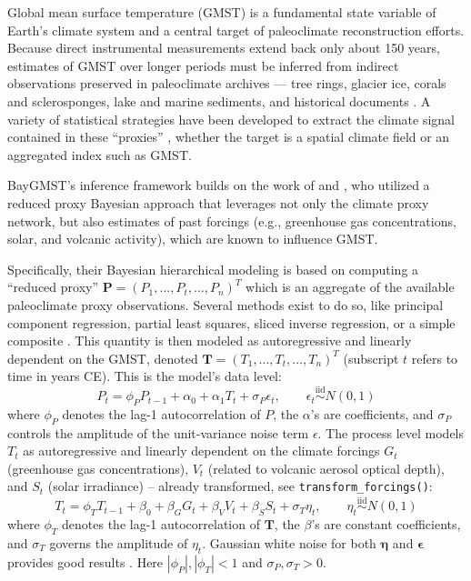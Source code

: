 \documentclass[10pt]{article}
\begin{document}
Global mean surface temperature (GMST) is a fundamental state variable of
Earth's climate system and a central target of paleoclimate reconstruction
efforts. Because direct instrumental measurements extend back only about
150 years, estimates of GMST over longer periods must be inferred from
indirect observations preserved in paleoclimate archives --- tree rings,
glacier ice, corals and sclerosponges, lake and marine sediments, and
historical documents \citep{mann1999, moberg2005}. A variety of statistical
strategies have been developed to extract the climate signal contained in
these ``proxies'' \citep{TINGLEY20121, Smerdon2016}, whether the target is
a spatial climate field \citep{Smerdon2023} or an aggregated index such as
GMST.

BayGMST's inference framework builds on the work of \citet{Barboza2014,
Barboza2019} and \citet{wang2020}, who utilized a reduced proxy Bayesian
approach that leverages not only the climate proxy network, but also
estimates of past forcings (e.g., greenhouse gas concentrations, solar, and
volcanic activity), which are known to influence GMST.

Specifically, their Bayesian hierarchical modeling is based on computing a
``reduced proxy'' $\boldsymbol{P} = (P_1,...,P_t,...,P_n)^T$ which is an
aggregate of the available paleoclimate proxy observations. Several methods
exist to do so, like principal component regression, partial least squares,
sliced inverse regression, or a simple composite \citep{Barboza2019}. This
quantity is then modeled as autoregressive and linearly dependent on the
GMST, denoted $\boldsymbol{T} = (T_1,...,T_t,...,T_n)^T$ (subscript $t$
refers to time in years CE). This is the model's data level:
\begin{equation}
  P_t = \phi_P P_{t-1} + \alpha_0 + \alpha_1 T_t + \sigma_P \epsilon_t,
  \qquad \epsilon_t \overset{\text{iid}}{\sim} N(0, 1)
  \label{eq:proxy}
\end{equation}
where $\phi_P$ denotes the lag-1 autocorrelation of $P$, the $\alpha$'s are
coefficients, and $\sigma_P$ controls the amplitude of the unit-variance
noise term $\epsilon$. The process level models $T_t$ as autoregressive and
linearly dependent on the climate forcings $G_t$ (greenhouse gas
concentrations), $V_t$ (related to volcanic aerosol optical depth), and
$S_t$ (solar irradiance) -- already transformed, see
\texttt{transform\_forcings()}:
\begin{equation}
  T_t = \phi_T T_{t-1} + \beta_0 + \beta_G G_t + \beta_V V_t + \beta_S S_t + \sigma_T \eta_t,
  \qquad \eta_t \overset{\text{iid}}{\sim} N(0, 1)
  \label{eq:temp}
\end{equation}
where $\phi_T$ denotes the lag-1 autocorrelation of $\boldsymbol{T}$, the
$\beta$'s are constant coefficients, and $\sigma_T$ governs the amplitude
of $\eta_t$. Gaussian white noise for both $\boldsymbol{\eta}$ and
$\boldsymbol{\epsilon}$ provides good results \citep{wang2020}. Here
$|\phi_P|, |\phi_T| < 1$ and $\sigma_P, \sigma_T > 0$.
\end{document}
